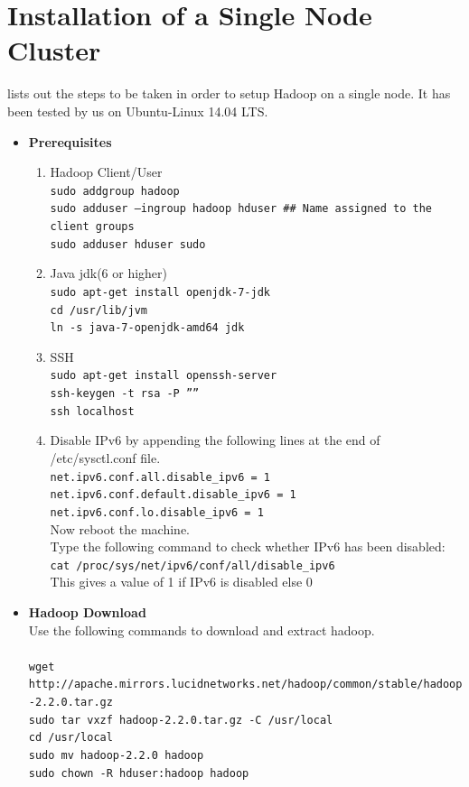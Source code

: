 \documentclass[12pt]{book}
\newcommand{\shellcmd}[1]{\\\indent\texttt{\footnotesize #1}\\}
\begin{document}
\section{Installation of a Single Node Cluster}\label{sin}
\cite{single} lists out the steps to be taken in order to setup Hadoop on a single node. It has been tested by us on Ubuntu-Linux 14.04 LTS.
\begin{itemize}
 \item \textbf{Prerequisites}
\begin{enumerate}
 \item Hadoop Client/User
       \shellcmd{sudo addgroup hadoop  \\\indent 
                sudo adduser –ingroup hadoop hduser \#\# Name assigned to the client groups\\\indent 
                sudo adduser hduser sudo
                }
 \item Java jdk(6 or higher)
       \shellcmd{sudo apt-get install openjdk-7-jdk  \\\indent 
                 cd /usr/lib/jvm \\\indent 
                 ln -s java-7-openjdk-amd64 jdk}
  \item SSH
        \shellcmd{sudo apt-get install openssh-server  \\\indent 
                  ssh-keygen -t rsa -P ”” \\\indent 
                  ssh localhost}
  \item Disable IPv6 by appending the following lines at the end of /etc/sysctl.conf file.
      \shellcmd{net.ipv6.conf.all.disable\_ipv6 = 1\\
	  net.ipv6.conf.default.disable\_ipv6 = 1\\
	  net.ipv6.conf.lo.disable\_ipv6 = 1
      }
      Now reboot the machine.\\
      Type the following command to check whether IPv6 has been disabled:
      \shellcmd{cat /proc/sys/net/ipv6/conf/all/disable\_ipv6}
      This gives a value of 1 if IPv6 is disabled else 0
\end{enumerate}

\item \textbf{Hadoop Download}\\
Use the following commands to download and extract hadoop.\\
\shellcmd{wget http://apache.mirrors.lucidnetworks.net/hadoop/common/stable/hadoop-2.2.0.tar.gz \\\indent 
	  sudo tar vxzf hadoop-2.2.0.tar.gz -C /usr/local \\\indent 
	  cd /usr/local\\\indent 
	  sudo mv hadoop-2.2.0 hadoop\\\indent 
	  sudo chown -R hduser:hadoop hadoop
	  }


\end{itemize}
\end{document}
